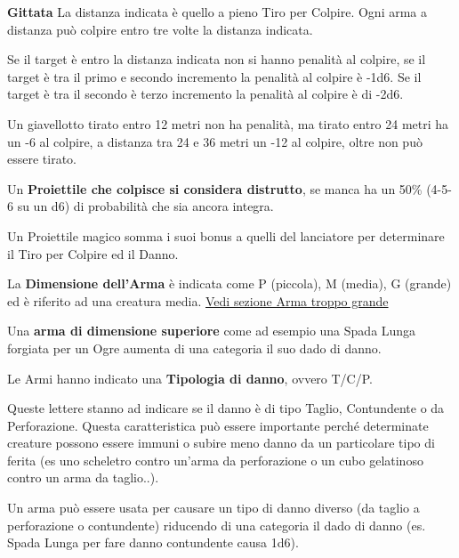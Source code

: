 \begin{multicols}{2}
\textbf{Gittata}
La distanza indicata è quello a pieno Tiro per Colpire. Ogni arma a distanza può colpire entro tre volte la distanza indicata.

Se il target è entro la distanza indicata non si hanno penalità al colpire, se il target è tra il primo e secondo incremento la penalità al colpire è -1d6. Se il target è tra il secondo è terzo incremento la penalità al colpire è di -2d6.

Un giavellotto tirato entro 12 metri non ha penalità, ma tirato entro 24 metri ha un -6 al colpire, a distanza tra 24 e 36 metri un -12 al colpire, oltre non può essere tirato.

Un \textbf{Proiettile che colpisce si considera distrutto}, se manca ha un 50\% (4-5-6 su un d6) di probabilità che sia ancora integra.

Un Proiettile magico somma i suoi bonus a quelli del lanciatore per determinare il Tiro per Colpire ed il Danno.

La \textbf{Dimensione dell'Arma}\label{dimensionediunarma}\hypertarget{dimensionediunarma}{} è indicata come P (piccola), M (media), G (grande) ed è riferito ad una creatura media. \hyperref[armatroppogrande]{Vedi sezione Arma troppo grande}

Una \textbf{arma di dimensione superiore}  come ad esempio una Spada Lunga forgiata per un Ogre aumenta di una categoria il suo dado di danno.

Le Armi hanno indicato una \textbf{Tipologia di danno}, ovvero T/C/P.

Queste lettere stanno ad indicare se il danno è di tipo Taglio, Contundente o da Perforazione. Questa caratteristica può essere importante perché determinate creature possono essere immuni o subire meno danno da un particolare tipo di ferita (es uno scheletro contro un'arma da perforazione o un cubo gelatinoso contro un arma da taglio..).

Un arma può essere usata per causare un tipo di danno diverso (da taglio a perforazione o contundente) riducendo di una categoria il dado di danno (es. Spada Lunga per fare danno contundente causa 1d6).

\medskip


\end{multicols}
